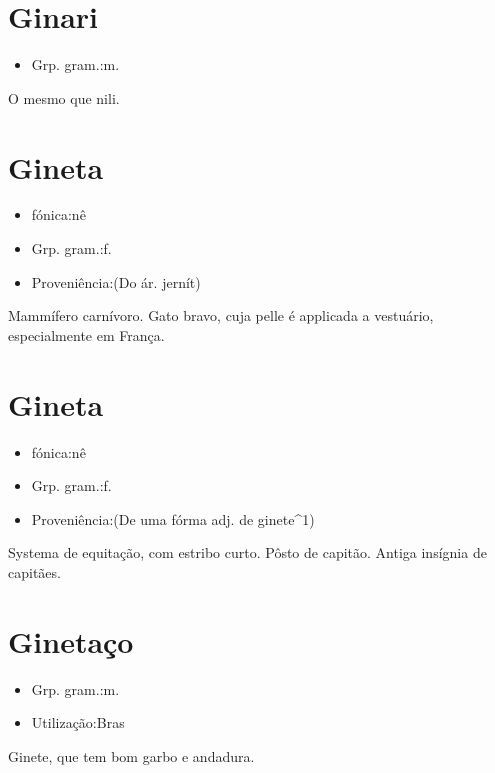 \section{Ginari}
\begin{itemize}
\item {Grp. gram.:m.}
\end{itemize}
O mesmo que \textunderscore nili\textunderscore .
\section{Gineta}
\begin{itemize}
\item {fónica:nê}
\end{itemize}
\begin{itemize}
\item {Grp. gram.:f.}
\end{itemize}
\begin{itemize}
\item {Proveniência:(Do ár. \textunderscore jernít\textunderscore )}
\end{itemize}
Mammífero carnívoro.
Gato bravo, cuja pelle é applicada a vestuário, especialmente em França.
\section{Gineta}
\begin{itemize}
\item {fónica:nê}
\end{itemize}
\begin{itemize}
\item {Grp. gram.:f.}
\end{itemize}
\begin{itemize}
\item {Proveniência:(De uma fórma adj. de \textunderscore ginete\textunderscore ^1)}
\end{itemize}
Systema de equitação, com estribo curto.
Pôsto de capitão.
Antiga insígnia de capitães.
\section{Ginetaço}
\begin{itemize}
\item {Grp. gram.:m.}
\end{itemize}
\begin{itemize}
\item {Utilização:Bras}
\end{itemize}
Ginete, que tem bom garbo e andadura.
